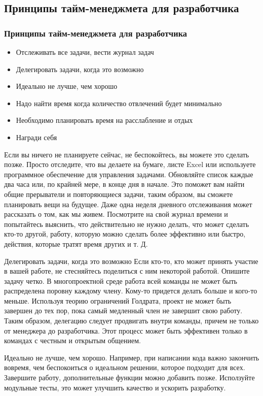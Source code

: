 \documentclass{../industrial-development}
\begin{document}
\subsection{Принципы тайм-менеджмета для разработчика}

\begin{frame} \frametitle{Принципы тайм-менеджмета для разработчика}
  \begin{itemize}
  \item Отслеживать все задачи, вести журнал задач
  \item Делегировать задачи, когда это возможно
  \item Идеально не лучше, чем хорошо
  \item Надо найти время когда количество отвлечений будет минимально
  \item Необходимо планировать время на расслабление и отдых
  \item Награди себя
  \end{itemize}
\end{frame}

\lecturenotes

Если вы ничего не планируете сейчас, не беспокойтесь, вы можете это сделать позже. Просто отследите, что вы делаете на бумаге, листе Excel или используете программное обеспечение для управления задачами. Обновляйте список каждые два часа или, по крайней мере, в конце дня в начале. Это поможет вам найти общие прерыватели и повторяющиеся задачи, таким образом, вы сможете планировать вещи на будущее. Даже одна неделя дневного отслеживания может рассказать о том, как мы живем.
Посмотрите на свой журнал времени и попытайтесь выяснить, что действительно не нужно делать, что может сделать кто-то другой, работу, которую можно сделать более эффективно или быстро, действия, которые тратят время других и т. Д.

Делегировать задачи, когда это возможно
Если кто-то, кто может принять участие в вашей работе, не стесняйтесь поделиться с ним некоторой работой. Опишите задачу четко.
В многопроектной среде работа всей команды не может быть распределена поровну каждому члену. Кому-то придется делать больше и кого-то меньше. Используя теорию ограничений Голдрата, проект не может быть завершен до тех пор, пока самый медленный член не завершит свою работу. Таким образом, делегацию следует продвигать внутри команды, причем не только от менеджера до разработчика. Этот процесс может быть эффективен только в командах с честным и открытым общением.

Идеально не лучше, чем хорошо.
Например, при написании кода важно закончить вовремя, чем беспокоиться о идеальном решении, которое подходит для всех. Завершите работу, дополнительные функции можно добавить позже.  Исползуйте модульные тесты, это может улучшить качество и ускорить разработку.
\end{document}
